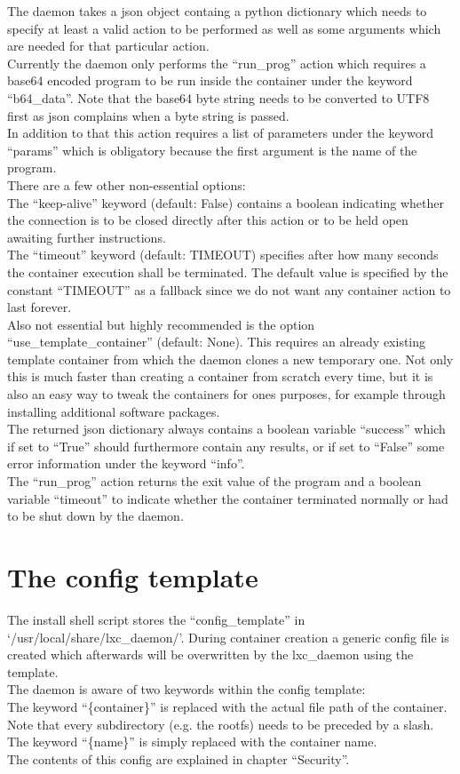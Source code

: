 The daemon takes a json object containg a python dictionary which needs to specify at least a valid action to
be performed as well as some arguments which are needed for that particular action.\\
Currently the daemon only performs the ``run\_prog'' action which requires a base64 encoded program to be run
inside the container under the keyword ``b64\_data''. Note that the base64 byte string needs to be converted to
UTF8 first as json complains when a byte string is passed.\\
In addition to that this action requires a list of parameters under the keyword ``params'' which is obligatory
because the first argument is the name of the program.\\
There are a few other non-essential options:\\
The ``keep-alive'' keyword (default: False) contains a boolean indicating whether the connection is to be closed
directly after this action or to be held open awaiting further instructions.\\
The ``timeout'' keyword (default: TIMEOUT) specifies after how many seconds the container execution shall be
terminated. The default value is specified by the constant ``TIMEOUT'' as a fallback since we do not want any
container action to last forever.\\
Also not essential but highly recommended is the option ``use\_template\_container'' (default: None). This
requires an already existing template container from which the daemon clones a new temporary one. Not only
this is much faster than creating a container from scratch every time, but it is also an easy way to tweak
the containers for ones purposes, for example through installing additional software packages.\\
The returned json dictionary always contains a boolean variable ``success'' which if set to ``True'' should
furthermore contain any results, or if set to ``False'' some error information under the keyword ``info''.\\
The ``run\_prog'' action returns the exit value of the program and a boolean variable ``timeout'' to indicate
whether the container terminated normally or had to be shut down by the daemon.

\section{The config template}

The install shell script stores the ``config\_template'' in `/usr/local/share/lxc\_daemon/'. During container
creation a generic config file is created which afterwards will be overwritten by the lxc\_daemon using
the template.\\
The daemon is aware of two keywords within the config template:\\
The keyword ``\{container\}'' is replaced with the actual file path of the container. Note that every
subdirectory (e.g. the rootfs) needs to be preceded by a slash.\\
The keyword ``\{name\}'' is simply replaced with the container name.\\
The contents of this config are explained in chapter ``Security''.

